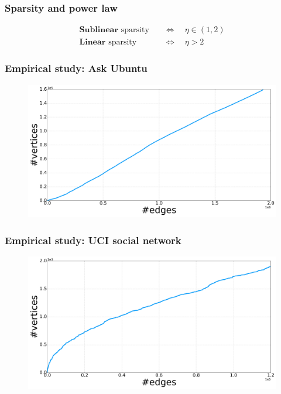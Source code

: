 \documentclass[final,hyperref={pdfpagelabels=false},noamsthm]{beamer}
\begin{document}
\begin{frame}
	\frametitle{Sparsity and power law}
	\begin{align*}
	\textbf{Sublinear } \text{sparsity} & \quad \iff \quad  \eta \in (1,2) \\
	\textbf{Linear } \text{sparsity} & \quad \iff \quad \eta > 2
	\end{align*}
\end{frame}

\begin{frame}
	\frametitle{Empirical study: Ask Ubuntu}
	\begin{figure}[h]
		\includegraphics[width=1.0\textwidth]{fig/n_askubuntu_arrival.pdf}
	\end{figure}
\end{frame}

\begin{frame}
	\frametitle{Empirical study: UCI social network}
	\begin{figure}[h]
		\includegraphics[width=1.0\textwidth]{fig/n_CollegeMsg_arrival.pdf}
	\end{figure}
\end{frame}
\end{document}
